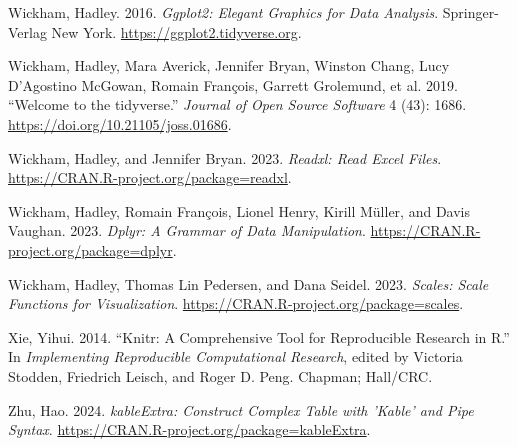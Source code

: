 \documentclass[
  letterpaper,
  DIV=11,
  numbers=noendperiod]{scrartcl}
\newlength{\cslhangindent}
\newlength{\cslentryspacingunit} %
\newenvironment{CSLReferences}[2] %
 {%
  \setlength{\parindent}{0pt}
  \ifodd #1
  \let\oldpar\par
  \def\par{\hangindent=\cslhangindent\oldpar}
  \fi
  \setlength{\parskip}{#2\cslentryspacingunit}
 }%
 {}
\begin{document}
\begin{CSLReferences}{1}{0}
\leavevmode{}%
Wickham, Hadley. 2016. \emph{Ggplot2: Elegant Graphics for Data
Analysis}. Springer-Verlag New York.
\url{https://ggplot2.tidyverse.org}.

\leavevmode{}%
Wickham, Hadley, Mara Averick, Jennifer Bryan, Winston Chang, Lucy
D'Agostino McGowan, Romain François, Garrett Grolemund, et al. 2019.
{``Welcome to the {tidyverse}.''} \emph{Journal of Open Source Software}
4 (43): 1686. \url{https://doi.org/10.21105/joss.01686}.

\leavevmode{}%
Wickham, Hadley, and Jennifer Bryan. 2023. \emph{Readxl: Read Excel
Files}. \url{https://CRAN.R-project.org/package=readxl}.

\leavevmode{}%
Wickham, Hadley, Romain François, Lionel Henry, Kirill Müller, and Davis
Vaughan. 2023. \emph{Dplyr: A Grammar of Data Manipulation}.
\url{https://CRAN.R-project.org/package=dplyr}.

\leavevmode{}%
Wickham, Hadley, Thomas Lin Pedersen, and Dana Seidel. 2023.
\emph{Scales: Scale Functions for Visualization}.
\url{https://CRAN.R-project.org/package=scales}.

\leavevmode{}%
Xie, Yihui. 2014. {``Knitr: A Comprehensive Tool for Reproducible
Research in {R}.''} In \emph{Implementing Reproducible Computational
Research}, edited by Victoria Stodden, Friedrich Leisch, and Roger D.
Peng. Chapman; Hall/CRC.

\leavevmode{}%
Zhu, Hao. 2024. \emph{kableExtra: Construct Complex Table with 'Kable'
and Pipe Syntax}. \url{https://CRAN.R-project.org/package=kableExtra}.

\end{CSLReferences}
\end{document}
